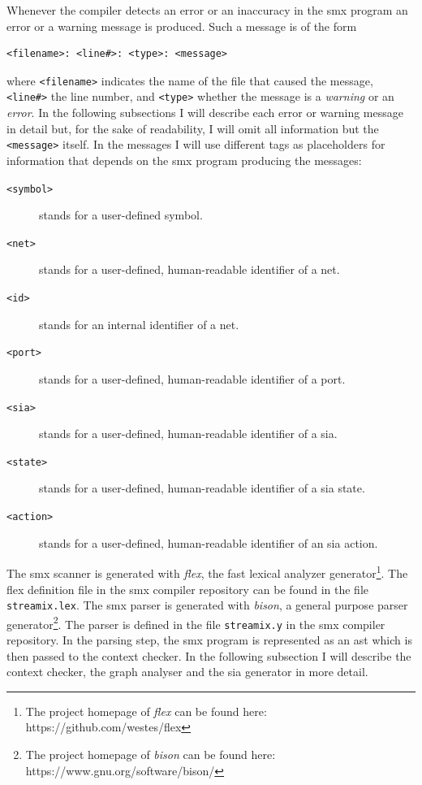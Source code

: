 Whenever the compiler detects an error or an inaccuracy in the \gls*{smx} program an error or a warning message is produced.
Such a message is of the form
\begin{lstlisting}[style=msg]
<filename>: <line#>: <type>: <message>
\end{lstlisting}
where \texttt{<filename>} indicates the name of the file that caused the message, \texttt{<line\#>} the line number, and \texttt{<type>} whether the message is a \emph{warning} or an \emph{error}.
In the following subsections I will describe each error or warning message in detail but, for the sake of readability, I will omit all information but the \texttt{<message>} itself.
In the messages I will use different tags as placeholders for information that depends on the \gls*{smx} program producing the messages:
\begin{description}
    \item[\texttt{<symbol>}] stands for a user-defined symbol.
    \item[\texttt{<net>}] stands for a user-defined, human-readable identifier of a net.
    \item[\texttt{<id>}] stands for an internal identifier of a net.
    \item[\texttt{<port>}] stands for a user-defined, human-readable identifier of a port.
    \item[\texttt{<sia>}] stands for a user-defined, human-readable identifier of a \gls{sia}.
    \item[\texttt{<state>}] stands for a user-defined, human-readable identifier of a \gls{sia} state.
    \item[\texttt{<action>}] stands for a user-defined, human-readable identifier of an \gls{sia} action.
\end{description}

The \gls*{smx} scanner is generated with \emph{flex}, the fast lexical analyzer generator\footnote{The project homepage of \emph{flex} can be found here: https://github.com/westes/flex}.
The flex definition file in the \gls*{smx} compiler repository can be found in the file \texttt{streamix.lex}.
The \gls*{smx} parser is generated with \emph{bison}, a general purpose parser generator\footnote{The project homepage of \emph{bison} can be found here: https://www.gnu.org/software/bison/}.
The parser is defined in the file \texttt{streamix.y} in the \gls*{smx} compiler repository.
In the parsing step, the \gls*{smx} program is represented as an \gls{ast} which is then passed to the context checker.
In the following subsection I will describe the context checker, the graph analyser and the \gls{sia} generator in more detail.

